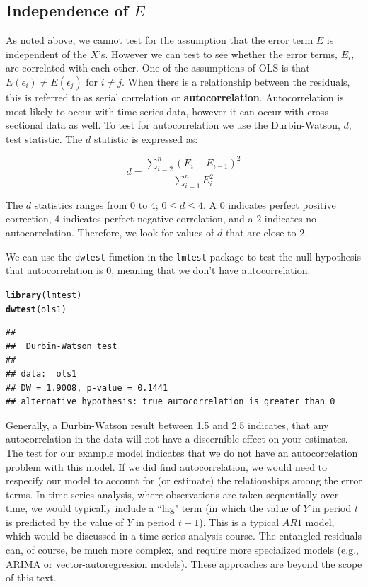 \documentclass[11pt,openany]{book}
\makeatletter
\newcommand{\hlstd}[1]{\textcolor[rgb]{0.345,0.345,0.345}{#1}}%
\newcommand{\hlkwd}[1]{\textcolor[rgb]{0.737,0.353,0.396}{\textbf{#1}}}%
\newenvironment{kframe}{%
 \def\at@end@of@kframe{}%
 \ifinner\ifhmode%
  \def\at@end@of@kframe{\end{minipage}}%
  \begin{minipage}{\columnwidth}%
 \fi\fi%
 \def\FrameCommand##1{\hskip\@totalleftmargin \hskip-\fboxsep
 \colorbox{shadecolor}{##1}\hskip-\fboxsep
     \hskip-\linewidth \hskip-\@totalleftmargin \hskip\columnwidth}%
 \MakeFramed {\advance\hsize-\width
   \@totalleftmargin\z@ \linewidth\hsize
   \@setminipage}}%
 {\par\unskip\endMakeFramed%
 \at@end@of@kframe}
\newenvironment{knitrout}{}{} %
\renewenvironment{knitrout}{\begin{singlespace}}{\end{singlespace}}
\makeatother
\begin{document}
\subsection{Independence of $E$} 

As noted above, we cannot test for the assumption that the error term $E$ is independent of the $X$'s.  However we can test to see whether the error terms, $E_i$, are correlated with each other. One of the assumptions of OLS is that   $E(\epsilon_i) \neq E(\epsilon_j)$ for $i \neq j$. When there is a relationship between the residuals, this is referred to as serial correlation or \textbf{autocorrelation}. Autocorrelation is most likely to occur with time-series data, however it can occur with cross-sectional data as well. To test for autocorrelation we use the Durbin-Watson, $d$, test statistic. The $d$ statistic is expressed as:

\begin{equation}
  \label{eq:dw}
  d = \frac{\sum_{i=2}^{n} (E_i-E_{i-1})^{2}}{\sum_{i=1}^{n} E^{2}_i}
\end{equation}

The $d$ statistics ranges from $0$ to $4$; $0 \leq d \leq 4$. A  $0$ indicates perfect positive correction, $4$ indicates perfect negative correlation, and a $2$ indicates no autocorrelation. Therefore, we look for values of $d$ that are close to $2$.  

We can use the \texttt{dwtest} function in the \texttt{lmtest} package to test the null hypothesis that autocorrelation is $0$, meaning that we don't have autocorrelation. 

\begin{knitrout}
\color{fgcolor}\begin{kframe}
\begin{alltt}
\hlkwd{library}\hlstd{(lmtest)}
\hlkwd{dwtest}\hlstd{(ols1)}
\end{alltt}
\begin{verbatim}
## 
## 	Durbin-Watson test
## 
## data:  ols1
## DW = 1.9008, p-value = 0.1441
## alternative hypothesis: true autocorrelation is greater than 0
\end{verbatim}
\end{kframe}
\end{knitrout}
\noindent Generally, a Durbin-Watson result between 1.5 and 2.5 indicates, that any autocorrelation in the data will not have a discernible effect on your estimates.  The test for our example model indicates that we do not have an autocorrelation problem with this model. If we did find autocorrelation, we would need to respecify our model to account for (or estimate) the relationships among the error terms. In time series analysis, where observations are taken sequentially over time, we would typically include a ``lag" term (in which the value of $Y$ in period $t$ is predicted by the value of $Y$ in period $t-1$). This is a typical $AR1$ model, which would be discussed in a time-series analysis course. The entangled residuals  can, of course, be much more complex, and require more specialized models (e.g.,  ARIMA or vector-autoregression models). These approaches are beyond the  scope of this text.
\end{document}

